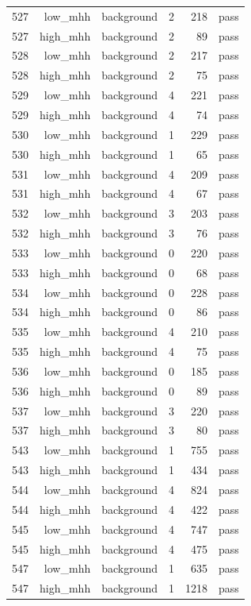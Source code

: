 \begin{table}[htbp]
{\begin{tabular}{lrrrrr}
527 & low\_mhh & background & 2 & 218 & pass \\
527 & high\_mhh & background & 2 & 89 & pass \\
528 & low\_mhh & background & 2 & 217 & pass \\
528 & high\_mhh & background & 2 & 75 & pass \\
529 & low\_mhh & background & 4 & 221 & pass \\
529 & high\_mhh & background & 4 & 74 & pass \\
530 & low\_mhh & background & 1 & 229 & pass \\
530 & high\_mhh & background & 1 & 65 & pass \\
531 & low\_mhh & background & 4 & 209 & pass \\
531 & high\_mhh & background & 4 & 67 & pass \\
532 & low\_mhh & background & 3 & 203 & pass \\
532 & high\_mhh & background & 3 & 76 & pass \\
533 & low\_mhh & background & 0 & 220 & pass \\
533 & high\_mhh & background & 0 & 68 & pass \\
534 & low\_mhh & background & 0 & 228 & pass \\
534 & high\_mhh & background & 0 & 86 & pass \\
535 & low\_mhh & background & 4 & 210 & pass \\
535 & high\_mhh & background & 4 & 75 & pass \\
536 & low\_mhh & background & 0 & 185 & pass \\
536 & high\_mhh & background & 0 & 89 & pass \\
537 & low\_mhh & background & 3 & 220 & pass \\
537 & high\_mhh & background & 3 & 80 & pass \\
543 & low\_mhh & background & 1 & 755 & pass \\
543 & high\_mhh & background & 1 & 434 & pass \\
544 & low\_mhh & background & 4 & 824 & pass \\
544 & high\_mhh & background & 4 & 422 & pass \\
545 & low\_mhh & background & 4 & 747 & pass \\
545 & high\_mhh & background & 4 & 475 & pass \\
547 & low\_mhh & background & 1 & 635 & pass \\
547 & high\_mhh & background & 1 & 1218 & pass \\

\end{tabular}}
\end{table}

